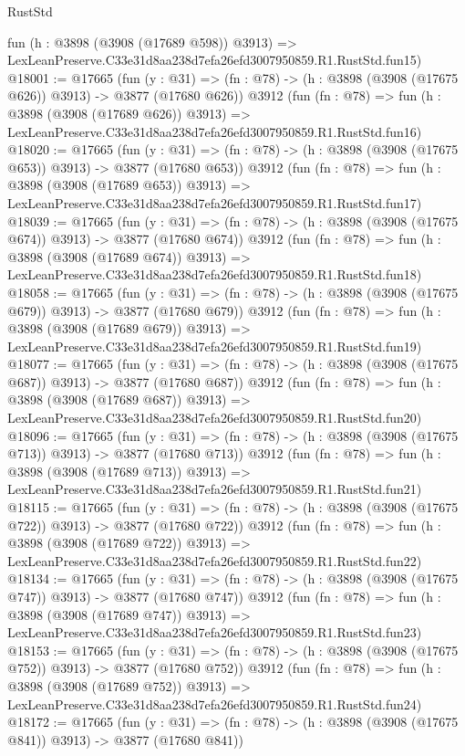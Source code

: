 \begin{lexlean}{RustStd}
\begin{coremodule}
    fun (h : @3898 (@3908 (@17689 @598)) @3913) =>
    LexLeanPreserve.C33e31d8aa238d7efa26efd3007950859.R1.RustStd.fun15)
@18001 := @17665
    (fun (y : @31) => (fn : @78) -> (h : @3898 (@3908 (@17675 @626)) @3913) -> @3877 (@17680 @626))
    @3912
    (fun (fn : @78) =>
    fun (h : @3898 (@3908 (@17689 @626)) @3913) =>
    LexLeanPreserve.C33e31d8aa238d7efa26efd3007950859.R1.RustStd.fun16)
@18020 := @17665
    (fun (y : @31) => (fn : @78) -> (h : @3898 (@3908 (@17675 @653)) @3913) -> @3877 (@17680 @653))
    @3912
    (fun (fn : @78) =>
    fun (h : @3898 (@3908 (@17689 @653)) @3913) =>
    LexLeanPreserve.C33e31d8aa238d7efa26efd3007950859.R1.RustStd.fun17)
@18039 := @17665
    (fun (y : @31) => (fn : @78) -> (h : @3898 (@3908 (@17675 @674)) @3913) -> @3877 (@17680 @674))
    @3912
    (fun (fn : @78) =>
    fun (h : @3898 (@3908 (@17689 @674)) @3913) =>
    LexLeanPreserve.C33e31d8aa238d7efa26efd3007950859.R1.RustStd.fun18)
@18058 := @17665
    (fun (y : @31) => (fn : @78) -> (h : @3898 (@3908 (@17675 @679)) @3913) -> @3877 (@17680 @679))
    @3912
    (fun (fn : @78) =>
    fun (h : @3898 (@3908 (@17689 @679)) @3913) =>
    LexLeanPreserve.C33e31d8aa238d7efa26efd3007950859.R1.RustStd.fun19)
@18077 := @17665
    (fun (y : @31) => (fn : @78) -> (h : @3898 (@3908 (@17675 @687)) @3913) -> @3877 (@17680 @687))
    @3912
    (fun (fn : @78) =>
    fun (h : @3898 (@3908 (@17689 @687)) @3913) =>
    LexLeanPreserve.C33e31d8aa238d7efa26efd3007950859.R1.RustStd.fun20)
@18096 := @17665
    (fun (y : @31) => (fn : @78) -> (h : @3898 (@3908 (@17675 @713)) @3913) -> @3877 (@17680 @713))
    @3912
    (fun (fn : @78) =>
    fun (h : @3898 (@3908 (@17689 @713)) @3913) =>
    LexLeanPreserve.C33e31d8aa238d7efa26efd3007950859.R1.RustStd.fun21)
@18115 := @17665
    (fun (y : @31) => (fn : @78) -> (h : @3898 (@3908 (@17675 @722)) @3913) -> @3877 (@17680 @722))
    @3912
    (fun (fn : @78) =>
    fun (h : @3898 (@3908 (@17689 @722)) @3913) =>
    LexLeanPreserve.C33e31d8aa238d7efa26efd3007950859.R1.RustStd.fun22)
@18134 := @17665
    (fun (y : @31) => (fn : @78) -> (h : @3898 (@3908 (@17675 @747)) @3913) -> @3877 (@17680 @747))
    @3912
    (fun (fn : @78) =>
    fun (h : @3898 (@3908 (@17689 @747)) @3913) =>
    LexLeanPreserve.C33e31d8aa238d7efa26efd3007950859.R1.RustStd.fun23)
@18153 := @17665
    (fun (y : @31) => (fn : @78) -> (h : @3898 (@3908 (@17675 @752)) @3913) -> @3877 (@17680 @752))
    @3912
    (fun (fn : @78) =>
    fun (h : @3898 (@3908 (@17689 @752)) @3913) =>
    LexLeanPreserve.C33e31d8aa238d7efa26efd3007950859.R1.RustStd.fun24)
@18172 := @17665
    (fun (y : @31) => (fn : @78) -> (h : @3898 (@3908 (@17675 @841)) @3913) -> @3877 (@17680 @841))

\end{coremodule}
\end{lexlean}
